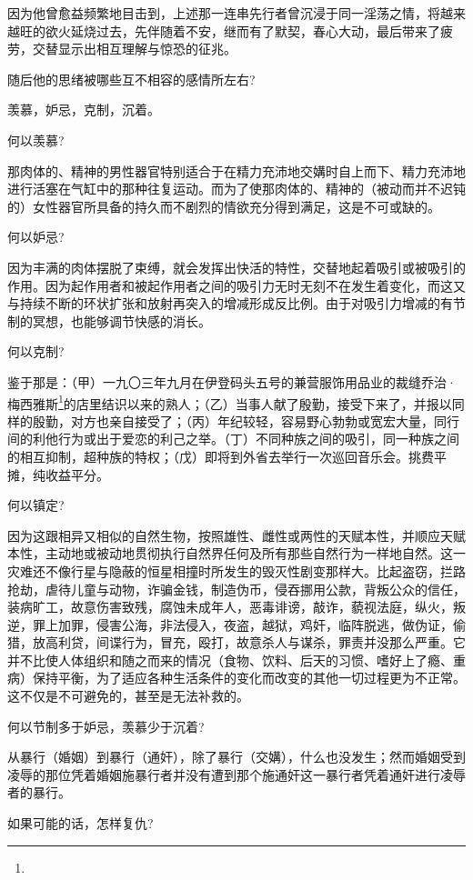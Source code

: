 \par 因为他曾愈益频繁地目击到，上述那一连串先行者曾沉浸于同一淫荡之情，将越来越旺的欲火延烧过去，先伴随着不安，继而有了默契，春心大动，最后带来了疲劳，交替显示出相互理解与惊恐的征兆。
\par 随后他的思绪被哪些互不相容的感情所左右?
\par 羡慕，妒忌，克制，沉着。
\par 何以羡慕?
\par 那肉体的、精神的男性器官特别适合于在精力充沛地交媾时自上而下、精力充沛地进行活塞在气缸中的那种往复运动。而为了使那肉体的、精神的（被动而并不迟钝的）女性器官所具备的持久而不剧烈的情欲充分得到满足，这是不可或缺的。
\par 何以妒忌?
\par 因为丰满的肉体摆脱了束缚，就会发挥出快活的特性，交替地起着吸引或被吸引的作用。因为起作用者和被起作用者之间的吸引力无时无刻不在发生着变化，而这又与持续不断的环状扩张和放射再突入的增减形成反比例。由于对吸引力增减的有节制的冥想，也能够调节快感的消长。
\par 何以克制?
\par 鉴于那是：（甲）一九〇三年九月在伊登码头五号的兼营服饰用品业的裁缝乔治·梅西雅斯\footnote{}的店里结识以来的熟人；（乙）当事人献了殷勤，接受下来了，并报以同样的殷勤，对方也亲自接受了；（丙）年纪较轻，容易野心勃勃或宽宏大量，同行间的利他行为或出于爱恋的利己之举。（丁）不同种族之间的吸引，同一种族之间的相互抑制，超种族的特权；（戊）即将到外省去举行一次巡回音乐会。挑费平摊，纯收益平分。
\par 何以镇定?
\par 因为这跟相异又相似的自然生物，按照雄性、雌性或两性的天赋本性，并顺应天赋本性，主动地或被动地贯彻执行自然界任何及所有那些自然行为一样地自然。这一灾难还不像行星与隐蔽的恒星相撞时所发生的毁灭性剧变那样大。比起盗窃，拦路抢劫，虐待儿童与动物，诈骗金钱，制造伪币，侵吞挪用公款，背叛公众的信任，装病旷工，故意伤害致残，腐蚀未成年人，恶毒诽谤，敲诈，藐视法庭，纵火，叛逆，罪上加罪，侵害公海，非法侵入，夜盗，越狱，鸡奸，临阵脱逃，做伪证，偷猎，放高利贷，间谍行为，冒充，殴打，故意杀人与谋杀，罪责并没那么严重。它并不比使人体组织和随之而来的情况（食物、饮料、后天的习惯、嗜好上了瘾、重病）保持平衡，为了适应各种生活条件的变化而改变的其他一切过程更为不正常。这不仅是不可避免的，甚至是无法补救的。
\par 何以节制多于妒忌，羡慕少于沉着?
\par 从暴行（婚姻）到暴行（通奸），除了暴行（交媾），什么也没发生；然而婚姻受到凌辱的那位凭着婚姻施暴行者并没有遭到那个施通奸这一暴行者凭着通奸进行凌辱者的暴行。
\par 如果可能的话，怎样复仇?
